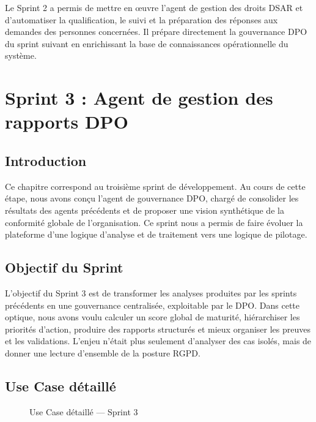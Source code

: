 \documentclass[12pt,a4paper]{report}
\begin{document}
Le Sprint 2 a permis de mettre en œuvre l'agent de gestion des droits DSAR et d'automatiser la qualification, le suivi et la préparation des réponses aux demandes des personnes concernées. Il prépare directement la gouvernance DPO du sprint suivant en enrichissant la base de connaissances opérationnelle du système.

\chapter{Sprint 3 : Agent de gestion des rapports DPO}

\section{Introduction}

Ce chapitre correspond au troisième sprint de développement. Au cours de cette étape, nous avons conçu l'agent de gouvernance DPO, chargé de consolider les résultats des agents précédents et de proposer une vision synthétique de la conformité globale de l'organisation. Ce sprint nous a permis de faire évoluer la plateforme d'une logique d'analyse et de traitement vers une logique de pilotage.

\section{Objectif du Sprint}

L'objectif du Sprint 3 est de transformer les analyses produites par les sprints précédents en une gouvernance centralisée, exploitable par le DPO. Dans cette optique, nous avons voulu calculer un score global de maturité, hiérarchiser les priorités d'action, produire des rapports structurés et mieux organiser les preuves et les validations. L'enjeu n'était plus seulement d'analyser des cas isolés, mais de donner une lecture d'ensemble de la posture RGPD.

\section{Use Case détaillé}

\begin{figure}[H]
\centering
{}
\caption{Use Case détaillé --- Sprint 3}
\label{fig:use_case_sprint3}
\end{figure}
\end{document}
